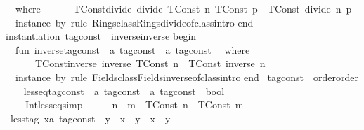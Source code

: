 \begin{isabellebody}
{\ \ where\isanewline
\ \ \ \ \ \ TConst{\isacharunderscore}divide{\isacharcolon}\ {\isasymopen}divide\ {\isacharparenleft}TConst\ n{\isacharparenright}\ {\isacharparenleft}TConst\ p{\isacharparenright}\ {\isacharequal}\ {\isacharparenleft}TConst\ {\isacharparenleft}divide\ n\ p{\isacharparenright}{\isacharparenright}{\isasymclose}\isanewline
\isanewline
\ \ instance\ by\ {\isacharparenleft}rule\ Rings{\isachardot}class{\isachardot}Rings{\isachardot}divide{\isachardot}of{\isacharunderscore}class{\isachardot}intro{\isacharparenright}\isanewline
end\isanewline
\isanewline
instantiation\ tag{\isacharunderscore}const\ {\isacharcolon}{\isacharcolon}\ {\isacharparenleft}inverse{\isacharparenright}inverse\isanewline
begin\isanewline
\ \ fun\ inverse{\isacharunderscore}tag{\isacharunderscore}const\ {\isacharcolon}{\isacharcolon}\ {\isasymopen}{\isacharprime}a\ tag{\isacharunderscore}const\ {\isasymRightarrow}\ {\isacharprime}a\ tag{\isacharunderscore}const{\isasymclose}\isanewline
\ \ where\isanewline
\ \ \ \ \ \ TConst{\isacharunderscore}inverse{\isacharcolon}\ {\isasymopen}inverse\ {\isacharparenleft}TConst\ n{\isacharparenright}\ {\isacharequal}\ {\isacharparenleft}TConst\ {\isacharparenleft}inverse\ n{\isacharparenright}{\isacharparenright}{\isasymclose}\isanewline
\isanewline
\ \ instance\ by\ {\isacharparenleft}rule\ Fields{\isachardot}class{\isachardot}Fields{\isachardot}inverse{\isachardot}of{\isacharunderscore}class{\isachardot}intro{\isacharparenright}\isanewline
end\isanewline
}\isanewline
\isanewline
{}\isamarkupfalse%
\ tag{\isacharunderscore}const\ {\isacharcolon}{\isacharcolon}\ {\isacharparenleft}order{\isacharparenright}order\isanewline
{}\isanewline
\ \ \isamarkupfalse%
\ less{\isacharunderscore}eq{\isacharunderscore}tag{\isacharunderscore}const\ {\isacharcolon}{\isacharcolon}\ {\isacartoucheopen}{\isacharprime}a\ tag{\isacharunderscore}const\ {\isasymRightarrow}\ {\isacharprime}a\ tag{\isacharunderscore}const\ {\isasymRightarrow}\ bool{\isacartoucheclose}\isanewline
\ \ \isanewline
\ \ \ \ Int{\isacharunderscore}less{\isacharunderscore}eq{\isacharbrackleft}simp{\isacharbrackright}{\isacharcolon}\ \ \ \ \ \ {\isacartoucheopen}n\ {\isasymle}\ m\ {\isasymLongrightarrow}\ {\isacharparenleft}TConst\ n{\isacharparenright}\ {\isasymle}\ {\isacharparenleft}TConst\ m{\isacharparenright}{\isacartoucheclose}\isanewline
\isanewline
\ \ \isamarkupfalse%
\ less{\isacharunderscore}tag{\isacharcolon}\ {\isacartoucheopen}{\isacharparenleft}x{\isacharcolon}{\isacharcolon}{\isacharprime}a\ tag{\isacharunderscore}const{\isacharparenright}\ {\isacharless}\ y\ {\isasymlongleftrightarrow}\ {\isacharparenleft}x\ {\isasymle}\ y{\isacharparenright}\ {\isasymand}\ {\isacharparenleft}x\ {\isasymnoteq}\ y{\isacharparenright}{\isacartoucheclose}\isanewline

\end{isabellebody}
